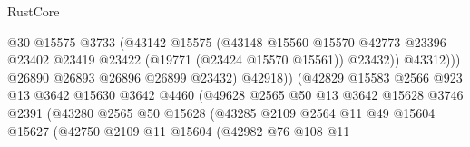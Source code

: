 \begin{lexlean}{RustCore}
\begin{coremodule}
                                          @30
                                          @15575
                                          @3733
                                          (@43142
                                            @15575
                                            (@43148
                                              @15560
                                              @15570
                                              @42773
                                              @23396
                                              @23402
                                              @23419
                                              @23422
                                              (@19771 (@23424 @15570 @15561))
                                              @23432))
                                          @43312)))
                                    @26890
                                    @26893
                                    @26896
                                    @26899
                                    @23432)
                                  @42918))
                              (@42829
                                @15583
                                @2566
                                @923
                                @13
                                @3642
                                @15630
                                @3642
                                @4460
                                (@49628
                                  @2565
                                  @50
                                  @13
                                  @3642
                                  @15628
                                  @3746
                                  @2391
                                  (@43280
                                    @2565
                                    @50
                                    @15628
                                    (@43285
                                      @2109
                                      @2564
                                      @11
                                      @49
                                      @15604
                                      @15627
                                      (@42750
                                        @2109
                                        @11
                                        @15604
                                        (@42982
                                          @76
                                          @108
                                          @11

\end{coremodule}
\end{lexlean}
